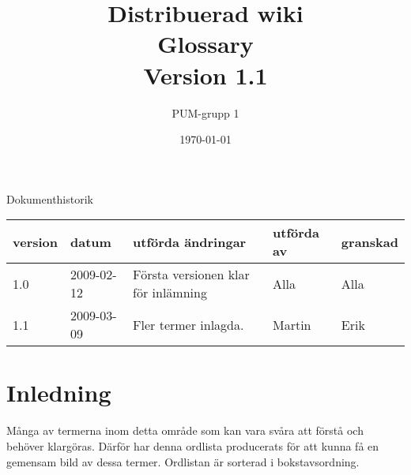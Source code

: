 

\ifpdf
\else
\fi

\title{Distribuerad wiki \\ Glossary \\ Version 1.1 }

\author{PUM-grupp 1}
\date{\today}



\maketitle\thispagestyle{empty}

\newpage

{\centering \Large{Dokumenthistorik\\}}

\vspace{10pt}
\begin{tabularx}{\textwidth}{ |l|l|X|l|l| }
  \hline
    \textbf{version} & \textbf{datum} & \textbf{utförda ändringar} & \textbf{utförda av} & \textbf{granskad} \\
	\hline 1.0 & 2009-02-12 &  Första versionen klar för inlämning  & Alla & Alla   \\
  \hline 1.1 & 2009-03-09 & Fler termer inlagda. & Martin & Erik\\
  \hline
\end{tabularx}

\newpage

\setcounter{tocdepth}{2}
\tableofcontents
\newpage


\section{Inledning}

Många av termerna inom detta område som kan vara svåra att förstå och behöver klargöras. Därför har denna ordlista producerats för att kunna få en gemensam bild av dessa termer. Ordlistan är sorterad i bokstavsordning.

